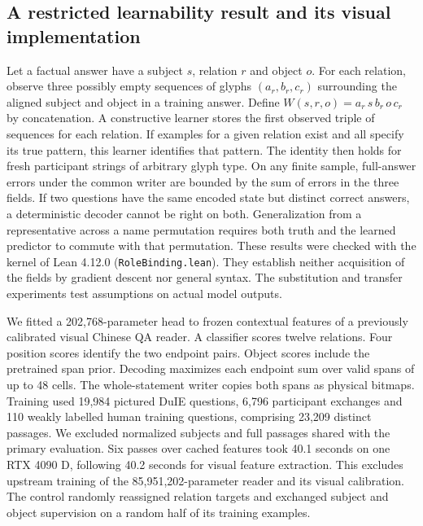 \subsection*{A restricted learnability result and its visual implementation}
Let a factual answer have a subject $s$, relation $r$ and object $o$. For each relation, observe three possibly empty sequences of glyphs $(a_r,b_r,c_r)$ surrounding the aligned subject and object in a training answer. Define $W(s,r,o)=a_r\,s\,b_r\,o\,c_r$ by concatenation. A constructive learner stores the first observed triple of sequences for each relation. If examples for a given relation exist and all specify its true pattern, this learner identifies that pattern. The identity then holds for fresh participant strings of arbitrary glyph type. On any finite sample, full-answer errors under the common writer are bounded by the sum of errors in the three fields. If two questions have the same encoded state but distinct correct answers, a deterministic decoder cannot be right on both. Generalization from a representative across a name permutation requires both truth and the learned predictor to commute with that permutation. These results were checked with the kernel of Lean 4.12.0 (\texttt{RoleBinding.lean}). They establish neither acquisition of the fields by gradient descent nor general syntax. The substitution and transfer experiments test assumptions on actual model outputs.

We fitted a 202,768-parameter head to frozen contextual features of a previously calibrated visual Chinese QA reader. A classifier scores twelve relations. Four position scores identify the two endpoint pairs. Object scores include the pretrained span prior. Decoding maximizes each endpoint sum over valid spans of up to 48 cells. The whole-statement writer copies both spans as physical bitmaps. Training used 19,984 pictured DuIE questions, 6,796 participant exchanges and 110 weakly labelled human training questions, comprising 23,209 distinct passages. We excluded normalized subjects and full passages shared with the primary evaluation. Six passes over cached features took 40.1 seconds on one RTX 4090 D, following 40.2 seconds for visual feature extraction. This excludes upstream training of the 85,951,202-parameter reader and its visual calibration. The control randomly reassigned relation targets and exchanged subject and object supervision on a random half of its training examples.

